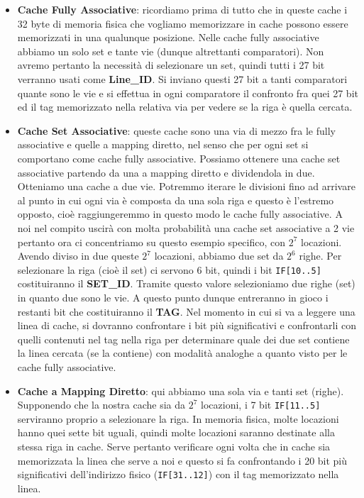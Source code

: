 \documentclass[11pt]{book}
\begin{document}
\begin{itemize}
\item \textbf{Cache Fully Associative}: ricordiamo prima di tutto che
  in queste cache i 32 byte di memoria fisica che vogliamo memorizzare
  in cache possono essere memorizzati in una qualunque
  posizione. Nelle cache fully associative abbiamo un solo set e tante
  vie (dunque altrettanti comparatori). Non avremo pertanto la
  necessit\`a di selezionare un set, quindi tutti i 27 bit verranno
  usati come \textbf{Line\_ID}. Si inviano questi 27 bit a tanti
  comparatori quante sono le vie e si effettua in ogni comparatore il
  confronto fra quei 27 bit ed il tag memorizzato nella relativa via
  per vedere se la riga \`e quella cercata.

\item \textbf{Cache Set Associative}: queste cache sono una via di
  mezzo fra le fully associative e quelle a mapping diretto, nel senso
  che per ogni set si comportano come cache fully
  associative. Possiamo ottenere una cache set associative partendo da
  una a mapping diretto e dividendola in due. Otteniamo una cache a
  due vie. Potremmo iterare le divisioni fino ad arrivare al punto in
  cui ogni via \`e composta da una sola riga e questo \`e l'estremo
  opposto, cio\`e raggiungeremmo in questo modo le cache fully
  associative. A noi nel compito uscir\`a con molta probabilit\`a una
  cache set associative a 2 vie pertanto ora ci concentriamo su questo
  esempio specifico, con $2^7$ locazioni. Avendo diviso in due queste
  $2^7$ locazioni, abbiamo due set da $2^6$ righe. Per selezionare la
  riga (cio\`e il set) ci servono 6 bit, quindi i bit
  \texttt{IF[10..5]} costituiranno il \textbf{SET\_ID}. Tramite questo
  valore selezioniamo due righe (set) in quanto due sono le vie. A
  questo punto dunque entreranno in gioco i restanti bit che
  costituiranno il \textbf{TAG}. Nel momento in cui si va a leggere
  una linea di cache, si dovranno confrontare i bit pi\`u
  significativi e confrontarli con quelli contenuti nel tag nella riga
  per determinare quale dei due set contiene la linea cercata (se la
  contiene) con modalit\`a analoghe a quanto visto per le cache fully
  associative. 

\item \textbf{Cache a Mapping Diretto}: qui abbiamo una sola via e
  tanti set (righe). Supponendo che la nostra cache sia da $2^7$
  locazioni, i 7 bit \texttt{IF[11..5]} serviranno proprio a
  selezionare la riga. In memoria fisica, molte locazioni hanno quei
  sette bit uguali, quindi molte locazioni saranno destinate alla
  stessa riga in cache. Serve pertanto verificare ogni volta che in
  cache sia memorizzata la linea che serve a noi e questo si fa
  confrontando i 20 bit pi\`u significativi dell'indirizzo fisico
  (\texttt{IF[31..12]}) con il tag memorizzato nella linea.
\end{itemize}
\end{document}
